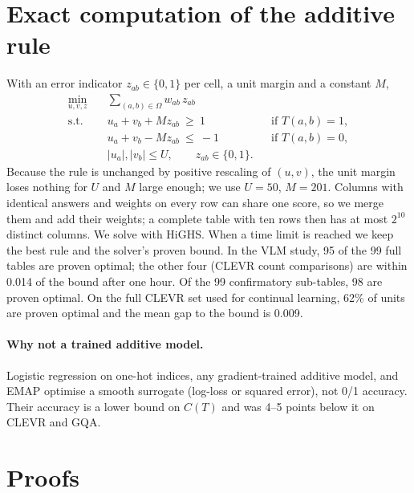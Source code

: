 \section{Exact computation of the additive rule}
\label{sup:milp}

With an error indicator $z_{ab}\in\{0,1\}$ per cell, a unit margin and a constant $M$,
\begin{align}
  \min_{u,v,z}\quad & \textstyle\sum_{(a,b)\in\Omega} w_{ab}\,z_{ab}\\
  \text{s.t.}\quad & u_a+v_b+M z_{ab}\ \ge\ 1 && \text{if } T(a,b)=1,\nonumber\\
  & u_a+v_b-M z_{ab}\ \le\ -1 && \text{if } T(a,b)=0,\nonumber\\
  & |u_a|,|v_b|\le U,\qquad z_{ab}\in\{0,1\}.\nonumber
\end{align}
Because the rule is unchanged by positive rescaling of $(u,v)$, the unit margin loses nothing
for $U$ and $M$ large enough; we use $U=50$, $M=201$. Columns with identical answers and
weights on every row can share one score, so we merge them and add their weights; a complete
table with ten rows then has at most $2^{10}$ distinct columns. We solve with HiGHS. When a
time limit is reached we keep the best rule and the solver's proven bound. In the VLM study,
95 of the 99 full tables are proven optimal; the other four (CLEVR count comparisons) are within
0.014 of the bound after one hour. Of the 99 confirmatory sub-tables, 98 are proven optimal. On
the full CLEVR set used for continual learning, 62\% of units are proven optimal and the mean
gap to the bound is 0.009.

\paragraph{Why not a trained additive model.}
Logistic regression on one-hot indices, any gradient-trained additive model, and EMAP optimise
a smooth surrogate (log-loss or squared error), not 0/1 accuracy. Their accuracy is a lower
bound on $C(T)$ and was 4--5 points below it on CLEVR and GQA.

\section{Proofs}
\label{sup:proofs}

